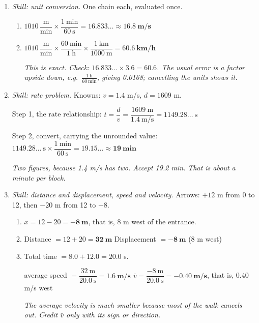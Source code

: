 \documentclass[12pt, twoside]{article}
\begin{document}
\begin{enumerate}[itemsep=0.5cm]
\item \emph{Skill: unit conversion.} One chain each, evaluated once.
  \begin{enumerate}[itemsep=0.3cm]
    \item $1010\,\dfrac{\text{m}}{\text{min}} \times \dfrac{1~\text{min}}{60~\text{s}}
      = 16.833\ldots \approx \mathbf{16.8~\textbf{m/s}}$
    \item $1010\,\dfrac{\text{m}}{\text{min}} \times \dfrac{60~\text{min}}{1~\text{h}}
      \times \dfrac{1~\text{km}}{1000~\text{m}} = \mathbf{60.6~\textbf{km/h}}$

      \emph{This is exact. Check: $16.833\ldots \times 3.6 = 60.6$. The usual error
      is a factor upside down, e.g.\ $\frac{1~\text{h}}{60~\text{min}}$, giving
      0.0168; cancelling the units shows it.}
  \end{enumerate}

\item \emph{Skill: rate problem.} Knowns: $v = 1.4$ m/s, $d = 1609$ m.

  Step 1, the rate relationship: \quad $t = \dfrac{d}{v} =
  \dfrac{1609~\text{m}}{1.4~\text{m/s}} = 1149.28\ldots~\text{s}$

  Step 2, convert, carrying the unrounded value: \quad
  $1149.28\ldots~\text{s} \times \dfrac{1~\text{min}}{60~\text{s}} = 19.15\ldots
  \approx \mathbf{19~\textbf{min}}$

  \emph{Two figures, because 1.4 m/s has two. Accept 19.2 min. That is about a minute
  per block.}

\newpage

\item \emph{Skill: distance and displacement, speed and velocity.} Arrows: $+12$ m
  from 0 to 12, then $-20$ m from 12 to $-8$.
  \begin{enumerate}[itemsep=0.3cm]
    \item $x = 12 - 20 = \mathbf{-8~\textbf{m}}$, that is, 8 m west of the entrance.
    \item Distance $= 12 + 20 = \mathbf{32~\textbf{m}}$ \qquad Displacement
      $= \mathbf{-8~\textbf{m}}$ (8 m west)
    \item Total time $= 8.0 + 12.0 = 20.0$ s.

      average speed $= \dfrac{32~\text{m}}{20.0~\text{s}} = \mathbf{1.6~\textbf{m/s}}$
      \qquad
      $\bar{v} = \dfrac{-8~\text{m}}{20.0~\text{s}} = \mathbf{-0.40~\textbf{m/s}}$,
      that is, 0.40 m/s west

      \emph{The average velocity is much smaller because most of the walk cancels
      out. Credit $\bar{v}$ only with its sign or direction.}
  \end{enumerate}


\end{enumerate}
\end{document}
